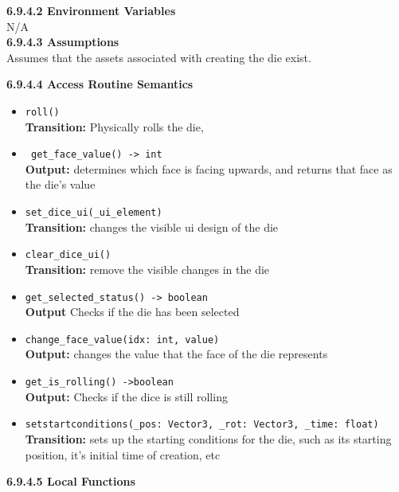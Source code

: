 \documentclass[12pt, titlepage]{article}
\begin{document}
\textbf{6.9.4.2 Environment Variables}\\

N/A\\


\textbf{6.9.4.3 Assumptions}\\
Assumes that the assets associated with creating the die exist. 

\textbf{6.9.4.4 Access Routine Semantics}
\begin{itemize}
	\item \texttt{roll() }\\
	\textbf{Transition:} Physically rolls the die, 
	
	\item \texttt{ get\_face\_value() -> int }\\
	\textbf{Output:} determines which face is facing upwards, and returns that face as the die's value
	
	\item \texttt{set\_dice\_ui(\_ui\_element) }\\
	\textbf{Transition:} changes the visible ui design of the die
	
	\item \texttt{clear\_dice\_ui() }\\
	\textbf{Transition:} remove the visible changes in the die
	
	\item \texttt{get\_selected\_status() -> boolean}\\
	\textbf{Output} Checks if the die has been selected
	
	\item \texttt{change\_face\_value(idx: int, value) }\\
	\textbf{Output:} changes the value that the face of the die represents
	
	\item \texttt{get\_is\_rolling() ->boolean }\\
	\textbf{Output:} Checks if the dice is still rolling
	
	\item \texttt{setstartconditions(\_pos: Vector3, \_rot: Vector3, \_time: float) }\\
	\textbf{Transition:} sets up the starting conditions for the die, such as its starting position, it's initial time of creation, etc
	


\end{itemize}

\textbf{6.9.4.5 Local Functions}
\end{document}
